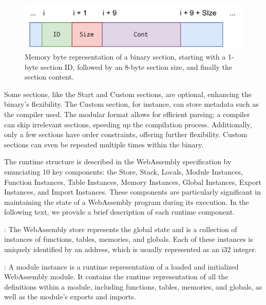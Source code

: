     
    \begin{figure}
    \centering
    \includegraphics[width=0.5\linewidth]{figures/section.pdf}
    \caption{Memory byte representation of a \Wasm binary section, starting with a 1-byte section ID, followed by an 8-byte section size, and finally the section content.}
    \label{background:wasm:fig:section}
    \end{figure}
    


Some sections, like the Start and Custom sections, are optional, enhancing the binary's flexibility. 
The Custom section, for instance, can store metadata such as the compiler used. 
The modular format allows for efficient parsing; a compiler can skip irrelevant sections, speeding up the compilation process. 
Additionally, only a few sections have order constraints, offering further flexibility. Custom sections can even be repeated multiple times within the binary.



\label{background:wasm:execution}


The \Wasm runtime structure is described in the WebAssembly specification by enunciating 10 key components: the Store, Stack, Locals, Module Instances, Function Instances, Table Instances, Memory Instances, Global Instances, Export Instances, and Import Instances. 
These components are particularly significant in maintaining the state of a WebAssembly program during its execution. 
In the following text, we provide a brief description of each runtime component.

: The WebAssembly store represents the global state and is a collection of instances of functions, tables, memories, and globals. Each of these instances is uniquely identified by an address, which is usually represented as an i32 integer.


: A module instance is a runtime representation of a loaded and initialized WebAssembly module. 
It contains the runtime representation of all the definitions within a module, including functions, tables, memories, and globals, as well as the module's exports and imports.


